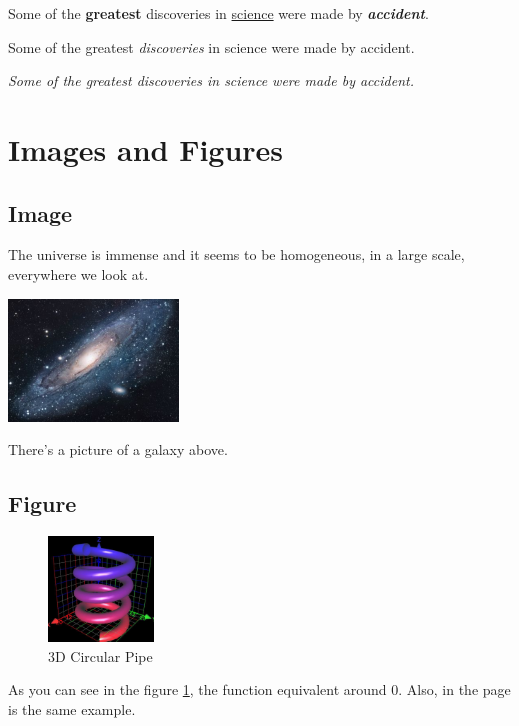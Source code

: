 \documentclass[12pt, a4paper]{report}
\begin{document}
Some of the \textbf{greatest} discoveries in \underline{science} were made by \textbf{\textit{accident}}. %

Some of the greatest \emph{discoveries} in science were made by accident.

\textit{Some of the greatest \emph{discoveries} in science were made by accident.}

\section{Images and Figures}

\subsection{Image}
The universe is immense and it seems to be homogeneous, in a large scale, everywhere we look at.

\includegraphics{universe} %

There's a picture of a galaxy above.

\subsection{Figure}
\begin{figure}[h] %
    \centering
    \includegraphics[width=0.25\textwidth]{graph}
    \caption{3D Circular Pipe}
    \label{fig:3D Torus}
\end{figure}

As you can see in the figure \ref{fig:3D Torus}, the function equivalent around 0. Also, in the page \pageref{fig:3D Torus}
is the same example.
\end{document}
